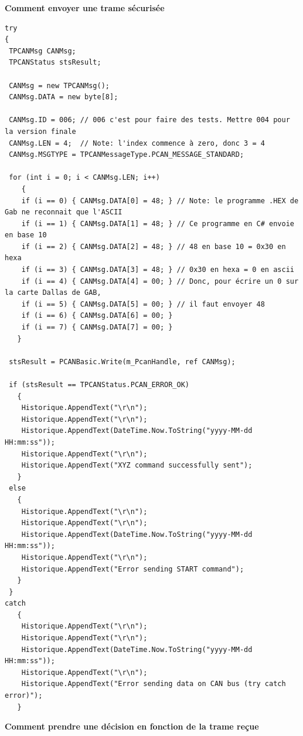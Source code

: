 \documentclass[10pt,a4paper,final]{article}
\begin{document}
\textbf{Comment envoyer une trame sécurisée}
\begin{lstlisting}
try
{
 TPCANMsg CANMsg;
 TPCANStatus stsResult;

 CANMsg = new TPCANMsg();
 CANMsg.DATA = new byte[8];

 CANMsg.ID = 006; // 006 c'est pour faire des tests. Mettre 004 pour la version finale
 CANMsg.LEN = 4;  // Note: l'index commence à zero, donc 3 = 4
 CANMsg.MSGTYPE = TPCANMessageType.PCAN_MESSAGE_STANDARD;

 for (int i = 0; i < CANMsg.LEN; i++)
    {
    if (i == 0) { CANMsg.DATA[0] = 48; } // Note: le programme .HEX de Gab ne reconnait que l'ASCII
    if (i == 1) { CANMsg.DATA[1] = 48; } // Ce programme en C# envoie en base 10
    if (i == 2) { CANMsg.DATA[2] = 48; } // 48 en base 10 = 0x30 en hexa
    if (i == 3) { CANMsg.DATA[3] = 48; } // 0x30 en hexa = 0 en ascii
    if (i == 4) { CANMsg.DATA[4] = 00; } // Donc, pour écrire un 0 sur la carte Dallas de GAB,
    if (i == 5) { CANMsg.DATA[5] = 00; } // il faut envoyer 48
    if (i == 6) { CANMsg.DATA[6] = 00; }
    if (i == 7) { CANMsg.DATA[7] = 00; }               
   }

 stsResult = PCANBasic.Write(m_PcanHandle, ref CANMsg);

 if (stsResult == TPCANStatus.PCAN_ERROR_OK)
   {
    Historique.AppendText("\r\n");
    Historique.AppendText("\r\n");
    Historique.AppendText(DateTime.Now.ToString("yyyy-MM-dd HH:mm:ss"));
    Historique.AppendText("\r\n");
    Historique.AppendText("XYZ command successfully sent");   
   }
 else
   {
    Historique.AppendText("\r\n");
    Historique.AppendText("\r\n");
    Historique.AppendText(DateTime.Now.ToString("yyyy-MM-dd HH:mm:ss"));
    Historique.AppendText("\r\n");
    Historique.AppendText("Error sending START command");  
   }
 }
catch
   {
    Historique.AppendText("\r\n");
    Historique.AppendText("\r\n");
    Historique.AppendText(DateTime.Now.ToString("yyyy-MM-dd HH:mm:ss"));
    Historique.AppendText("\r\n");
    Historique.AppendText("Error sending data on CAN bus (try catch error)"); 
   }
\end{lstlisting}
\pagebreak
\textbf{Comment prendre une décision en fonction de la trame reçue}
\end{document}

